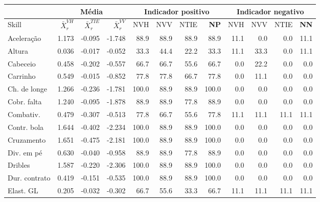 \documentclass[doc,apacite,oneside,a4paper,12pt]{apa6}
\begin{document}
\begin{table}[ht]
\begin{small}
\begin{tabular}{l||rrr||rrr|r|||rrr||r}
  \hline
     \hline
\rowcolor{SeaGreen3!30!} & \multicolumn{3}{c||}{Média} &   \multicolumn{4}{c|||}{Indicador positivo} & \multicolumn{4}{c}{Indicador negativo} \\
\hline 
  \hline
\rowcolor{SeaGreen3!30!} Skill &  $\bar{X}_r^{VH}$ &  $\bar{X}_r^{TIE}$ &  $\bar{X}_r^{VV}$ & NVH & NVV & NTIE & \textbf{NP }& NVH & NVV & NTIE & \textbf{NN }\\ 
 \hline
\rowcolor{gray!30!} Aceleração & 1.173 & -0.095 & -1.748 & 88.9 & 88.9 & 88.9 & 88.9 & 11.1 & 0.0 & 0.0 & 11.1 \\ 
\rowcolor{gray!10!}  Altura & 0.036 & -0.017 & -0.052 & 33.3 & 44.4 & 22.2 & 33.3 & 11.1 & 33.3 & 0.0 & 11.1 \\ 
\rowcolor{gray!30!}   Cabeceio & 0.458 & -0.202 & -0.557 & 66.7 & 66.7 & 55.6 & 66.7 & 0.0 & 22.2 & 0.0 & 0.0 \\ 
\rowcolor{gray!10!}   Carrinho & 0.549 & -0.015 & -0.852 & 77.8 & 77.8 & 66.7 & 77.8 & 0.0 & 11.1 & 0.0 & 0.0 \\ 
 \rowcolor{gray!30!}  Ch. de longe & 1.266 & -0.236 & -1.781 & 100.0 & 88.9 & 88.9 & 100.0 & 0.0 & 0.0 & 0.0 & 0.0 \\ 
\rowcolor{gray!10!}   Cobr. falta & 1.240 & -0.095 & -1.878 & 88.9 & 88.9 & 77.8 & 88.9 & 0.0 & 0.0 & 0.0 & 0.0 \\ 
 \rowcolor{gray!30!}  Combativ. & 0.479 & -0.307 & -0.513 & 77.8 & 66.7 & 55.6 & 77.8 & 11.1 & 11.1 & 11.1 & 11.1 \\ 
\rowcolor{gray!10!}   Contr. bola & 1.644 & -0.402 & -2.234 & 100.0 & 88.9 & 88.9 & 100.0 & 0.0 & 0.0 & 0.0 & 0.0 \\ 
\rowcolor{gray!30!}   Cruzamento & 1.651 & -0.475 & -2.181 & 100.0 & 88.9 & 88.9 & 100.0 & 0.0 & 0.0 & 0.0 & 0.0 \\ 
\rowcolor{gray!10!}   Div. em pé & 0.630 & -0.040 & -0.958 & 88.9 & 88.9 & 77.8 & 88.9 & 0.0 & 0.0 & 0.0 & 0.0 \\ 
\rowcolor{gray!30!}   Dribles & 1.587 & -0.220 & -2.306 & 100.0 & 88.9 & 88.9 & 100.0 & 0.0 & 0.0 & 0.0 & 0.0 \\ 
\rowcolor{gray!10!}   Dur. contrato & 0.419 & -0.151 & -0.535 & 100.0 & 88.9 & 88.9 & 100.0 & 0.0 & 0.0 & 0.0 & 0.0 \\ 
\rowcolor{gray!30!}   Elast. GL & 0.205 & -0.032 & -0.302 & 66.7 & 55.6 & 33.3 & 66.7 & 11.1 & 11.1 & 11.1 & 11.1 \\ 

\end{tabular}
\end{small}
\end{table}
\end{document}
